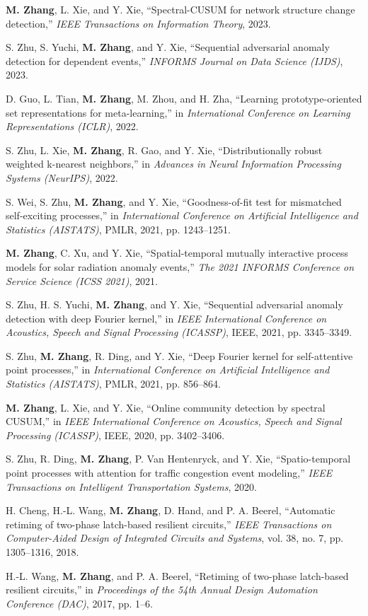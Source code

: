 \documentclass[10pt,letterpaper]{article}
\begin{document}
\begin{enumerate}[leftmargin=2.2em,label={[\arabic*]},topsep=2pt,itemsep=4pt,parsep=0pt]
  \item \textbf{M. Zhang}, L. Xie, and Y. Xie, ``Spectral-CUSUM for network structure change detection,'' \textit{IEEE Transactions on Information Theory}, 2023.
  \item S. Zhu, S. Yuchi, \textbf{M. Zhang}, and Y. Xie, ``Sequential adversarial anomaly detection for dependent events,'' \textit{INFORMS Journal on Data Science (IJDS)}, 2023.
  \item D. Guo, L. Tian, \textbf{M. Zhang}, M. Zhou, and H. Zha, ``Learning prototype-oriented set representations for meta-learning,'' in \textit{International Conference on Learning Representations (ICLR)}, 2022.
  \item S. Zhu, L. Xie, \textbf{M. Zhang}, R. Gao, and Y. Xie, ``Distributionally robust weighted k-nearest neighbors,'' in \textit{Advances in Neural Information Processing Systems (NeurIPS)}, 2022.
  \item S. Wei, S. Zhu, \textbf{M. Zhang}, and Y. Xie, ``Goodness-of-fit test for mismatched self-exciting processes,'' in \textit{International Conference on Artificial Intelligence and Statistics (AISTATS)}, PMLR, 2021, pp. 1243--1251.
  \item \textbf{M. Zhang}, C. Xu, and Y. Xie, ``Spatial-temporal mutually interactive process models for solar radiation anomaly events,'' \textit{The 2021 INFORMS Conference on Service Science (ICSS 2021)}, 2021.
  \item S. Zhu, H. S. Yuchi, \textbf{M. Zhang}, and Y. Xie, ``Sequential adversarial anomaly detection with deep Fourier kernel,'' in \textit{IEEE International Conference on Acoustics, Speech and Signal Processing (ICASSP)}, IEEE, 2021, pp. 3345--3349.
  \item S. Zhu, \textbf{M. Zhang}, R. Ding, and Y. Xie, ``Deep Fourier kernel for self-attentive point processes,'' in \textit{International Conference on Artificial Intelligence and Statistics (AISTATS)}, PMLR, 2021, pp. 856--864.
  \item \textbf{M. Zhang}, L. Xie, and Y. Xie, ``Online community detection by spectral CUSUM,'' in \textit{IEEE International Conference on Acoustics, Speech and Signal Processing (ICASSP)}, IEEE, 2020, pp. 3402--3406.
  \item S. Zhu, R. Ding, \textbf{M. Zhang}, P. Van Hentenryck, and Y. Xie, ``Spatio-temporal point processes with attention for traffic congestion event modeling,'' \textit{IEEE Transactions on Intelligent Transportation Systems}, 2020.
  \item H. Cheng, H.-L. Wang, \textbf{M. Zhang}, D. Hand, and P. A. Beerel, ``Automatic retiming of two-phase latch-based resilient circuits,'' \textit{IEEE Transactions on Computer-Aided Design of Integrated Circuits and Systems}, vol. 38, no. 7, pp. 1305--1316, 2018.
  \item H.-L. Wang, \textbf{M. Zhang}, and P. A. Beerel, ``Retiming of two-phase latch-based resilient circuits,'' in \textit{Proceedings of the 54th Annual Design Automation Conference (DAC)}, 2017, pp. 1--6.
\end{enumerate}
\end{document}
